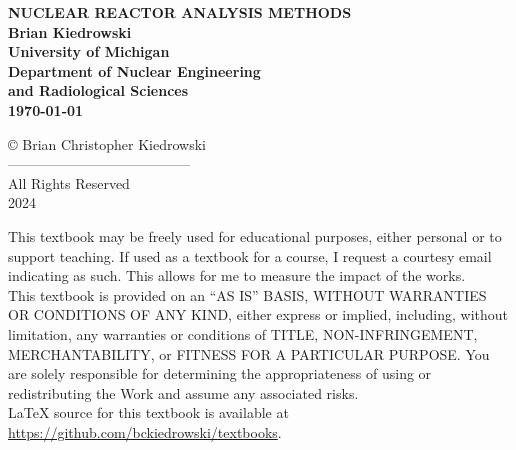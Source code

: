 
\thispagestyle{empty}
\begin{center}
\vspace*{1in}
{\LARGE  {\bf 
   NUCLEAR REACTOR ANALYSIS METHODS \vspace*{1in}  \\
   Brian Kiedrowski \vspace*{1in}  \\
   University of Michigan  \\   
   Department of Nuclear Engineering \\ and Radiological Sciences }} \\
    \vspace{3in} {\bf \large \today}
\end{center}
\pagebreak


\setcounter{page}{1}
\setcounter{chapter}{0}
 \vspace*{1em}
 \begin{center}
 \copyright \; {\large Brian Christopher Kiedrowski \\
 --------------------------------------- \\
 All Rights Reserved \\
 2024 }
 \end{center}
 
 \vspace*{3em}
\noindent \small This textbook may be freely used for educational purposes, either personal or to support teaching. If used as a textbook for a course, I request a courtesy email indicating as such. This allows for me to measure the impact of the works. \\

\noindent  This textbook is provided on an ``AS IS'' BASIS, WITHOUT WARRANTIES OR CONDITIONS OF ANY KIND, either express or implied, including, without limitation, any warranties or conditions of TITLE, NON-INFRINGEMENT, MERCHANTABILITY, or FITNESS FOR A PARTICULAR PURPOSE. You are solely responsible for determining the appropriateness of using or redistributing the Work and assume any associated risks. \\

\noindent LaTeX source for this textbook is available at \\ \url{https://github.com/bckiedrowski/textbooks}. \\

